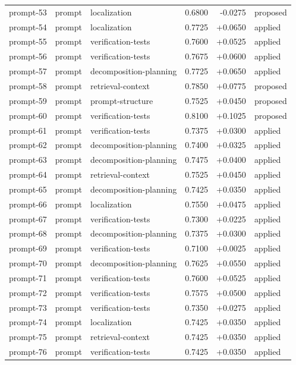 \begin{center}
\begin{longtable}{llp{5.2cm}rrl}
prompt-53 & prompt & localization & 0.6800 & -0.0275 & proposed \\
prompt-54 & prompt & localization & 0.7725 & +0.0650 & applied \\
prompt-55 & prompt & verification-tests & 0.7600 & +0.0525 & applied \\
prompt-56 & prompt & verification-tests & 0.7675 & +0.0600 & applied \\
prompt-57 & prompt & decomposition-planning & 0.7725 & +0.0650 & applied \\
prompt-58 & prompt & retrieval-context & 0.7850 & +0.0775 & proposed \\
prompt-59 & prompt & prompt-structure & 0.7525 & +0.0450 & proposed \\
prompt-60 & prompt & verification-tests & 0.8100 & +0.1025 & proposed \\
prompt-61 & prompt & verification-tests & 0.7375 & +0.0300 & applied \\
prompt-62 & prompt & decomposition-planning & 0.7400 & +0.0325 & applied \\
prompt-63 & prompt & decomposition-planning & 0.7475 & +0.0400 & applied \\
prompt-64 & prompt & retrieval-context & 0.7525 & +0.0450 & applied \\
prompt-65 & prompt & decomposition-planning & 0.7425 & +0.0350 & applied \\
prompt-66 & prompt & localization & 0.7550 & +0.0475 & applied \\
prompt-67 & prompt & verification-tests & 0.7300 & +0.0225 & applied \\
prompt-68 & prompt & decomposition-planning & 0.7375 & +0.0300 & applied \\
prompt-69 & prompt & verification-tests & 0.7100 & +0.0025 & applied \\
prompt-70 & prompt & decomposition-planning & 0.7625 & +0.0550 & applied \\
prompt-71 & prompt & verification-tests & 0.7600 & +0.0525 & applied \\
prompt-72 & prompt & verification-tests & 0.7575 & +0.0500 & applied \\
prompt-73 & prompt & verification-tests & 0.7350 & +0.0275 & applied \\
prompt-74 & prompt & localization & 0.7425 & +0.0350 & applied \\
prompt-75 & prompt & retrieval-context & 0.7425 & +0.0350 & applied \\
prompt-76 & prompt & verification-tests & 0.7425 & +0.0350 & applied \\

\end{longtable}
\end{center}
